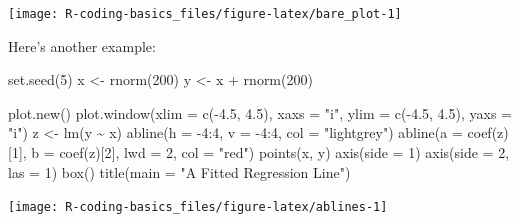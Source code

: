 \documentclass[
]{book}
\newenvironment{Shaded}{\begin{snugshade}}{\end{snugshade}}
\newcommand{\AttributeTok}[1]{\textcolor[rgb]{0.77,0.63,0.00}{#1}}
\newcommand{\DecValTok}[1]{\textcolor[rgb]{0.00,0.00,0.81}{#1}}
\newcommand{\FloatTok}[1]{\textcolor[rgb]{0.00,0.00,0.81}{#1}}
\newcommand{\FunctionTok}[1]{\textcolor[rgb]{0.00,0.00,0.00}{#1}}
\newcommand{\NormalTok}[1]{#1}
\newcommand{\OtherTok}[1]{\textcolor[rgb]{0.56,0.35,0.01}{#1}}
\newcommand{\SpecialCharTok}[1]{\textcolor[rgb]{0.00,0.00,0.00}{#1}}
\newcommand{\StringTok}[1]{\textcolor[rgb]{0.31,0.60,0.02}{#1}}
\begin{document}
\begin{center}\texttt{[image: R-coding-basics\_files/figure-latex/bare\_plot-1]} \end{center}

Here's another example:

\begin{Shaded}
\begin{Highlighting}[]
\FunctionTok{set.seed}\NormalTok{(}\DecValTok{5}\NormalTok{)}
\NormalTok{x }\OtherTok{\textless{}{-}} \FunctionTok{rnorm}\NormalTok{(}\DecValTok{200}\NormalTok{)}
\NormalTok{y }\OtherTok{\textless{}{-}}\NormalTok{ x }\SpecialCharTok{+} \FunctionTok{rnorm}\NormalTok{(}\DecValTok{200}\NormalTok{)}

\FunctionTok{plot.new}\NormalTok{()}
\FunctionTok{plot.window}\NormalTok{(}\AttributeTok{xlim =} \FunctionTok{c}\NormalTok{(}\SpecialCharTok{{-}}\FloatTok{4.5}\NormalTok{, }\FloatTok{4.5}\NormalTok{), }\AttributeTok{xaxs =} \StringTok{"i"}\NormalTok{, }
            \AttributeTok{ylim =} \FunctionTok{c}\NormalTok{(}\SpecialCharTok{{-}}\FloatTok{4.5}\NormalTok{, }\FloatTok{4.5}\NormalTok{), }\AttributeTok{yaxs =} \StringTok{"i"}\NormalTok{)}
\NormalTok{z }\OtherTok{\textless{}{-}} \FunctionTok{lm}\NormalTok{(y }\SpecialCharTok{\textasciitilde{}}\NormalTok{ x)}
\FunctionTok{abline}\NormalTok{(}\AttributeTok{h =} \SpecialCharTok{{-}}\DecValTok{4}\SpecialCharTok{:}\DecValTok{4}\NormalTok{, }\AttributeTok{v =} \SpecialCharTok{{-}}\DecValTok{4}\SpecialCharTok{:}\DecValTok{4}\NormalTok{, }\AttributeTok{col =} \StringTok{"lightgrey"}\NormalTok{)}
\FunctionTok{abline}\NormalTok{(}\AttributeTok{a =} \FunctionTok{coef}\NormalTok{(z)[}\DecValTok{1}\NormalTok{], }\AttributeTok{b =} \FunctionTok{coef}\NormalTok{(z)[}\DecValTok{2}\NormalTok{], }\AttributeTok{lwd =} \DecValTok{2}\NormalTok{, }\AttributeTok{col =} \StringTok{"red"}\NormalTok{)}
\FunctionTok{points}\NormalTok{(x, y)}
\FunctionTok{axis}\NormalTok{(}\AttributeTok{side =} \DecValTok{1}\NormalTok{)}
\FunctionTok{axis}\NormalTok{(}\AttributeTok{side =} \DecValTok{2}\NormalTok{, }\AttributeTok{las =} \DecValTok{1}\NormalTok{)}
\FunctionTok{box}\NormalTok{()}
\FunctionTok{title}\NormalTok{(}\AttributeTok{main =} \StringTok{"A Fitted Regression Line"}\NormalTok{)}
\end{Highlighting}
\end{Shaded}

\begin{center}\texttt{[image: R-coding-basics\_files/figure-latex/ablines-1]} \end{center}
\end{document}
